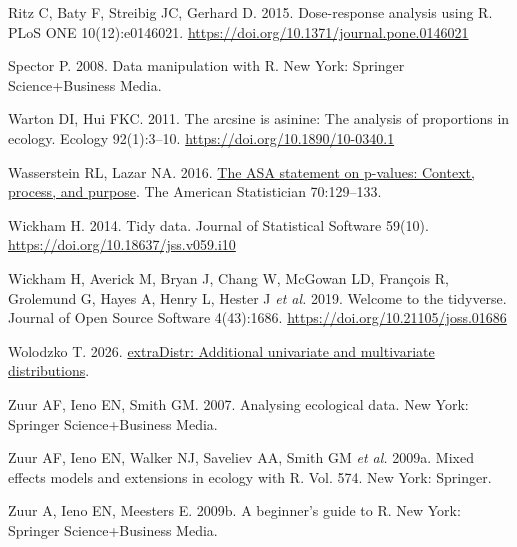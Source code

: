 \documentclass[
  13,
  letterpaper,
]{report}
\newlength{\cslhangindent}
\newenvironment{CSLReferences}[2] %
 {\begin{list}{}{%
  \setlength{\itemindent}{0pt}
  \setlength{\leftmargin}{0pt}
  \setlength{\parsep}{0pt}
  \ifodd #1
   \setlength{\leftmargin}{\cslhangindent}
   \setlength{\itemindent}{-1\cslhangindent}
  \fi
  \setlength{\itemsep}{#2\baselineskip}}}
 {\end{list}}
\begin{document}
\begin{CSLReferences}{1}{1}
Ritz C, Baty F, Streibig JC, Gerhard D. 2015. Dose-response analysis
using {R}. PLoS ONE 10(12):e0146021.
\url{https://doi.org/10.1371/journal.pone.0146021}

Spector P. 2008. Data manipulation with {R}. New York: Springer
Science+Business Media.

Warton DI, Hui FKC. 2011. The arcsine is asinine: The analysis of
proportions in ecology. Ecology 92(1):3--10.
\url{https://doi.org/10.1890/10-0340.1}

Wasserstein RL, Lazar NA. 2016.
\href{https://doi.org/10.1080/00031305.2016.1154108}{The ASA statement
on p-values: Context, process, and purpose}. The American Statistician
70:129--133.

Wickham H. 2014. Tidy data. Journal of Statistical Software 59(10).
\url{https://doi.org/10.18637/jss.v059.i10}

Wickham H, Averick M, Bryan J, Chang W, McGowan LD, François R,
Grolemund G, Hayes A, Henry L, Hester J \emph{et al.} 2019. Welcome to
the {tidyverse}. Journal of Open Source Software 4(43):1686.
\url{https://doi.org/10.21105/joss.01686}

Wolodzko T. 2026.
\href{https://CRAN.R-project.org/package=extraDistr}{extraDistr:
Additional univariate and multivariate distributions}.

Zuur AF, Ieno EN, Smith GM. 2007. Analysing ecological data. New York:
Springer Science+Business Media.

Zuur AF, Ieno EN, Walker NJ, Saveliev AA, Smith GM \emph{et al.} 2009a.
Mixed effects models and extensions in ecology with {R}. Vol. 574. New
York: Springer.

Zuur A, Ieno EN, Meesters E. 2009b. A beginner's guide to {R}. New York:
Springer Science+Business Media.

\end{CSLReferences}
\end{document}
